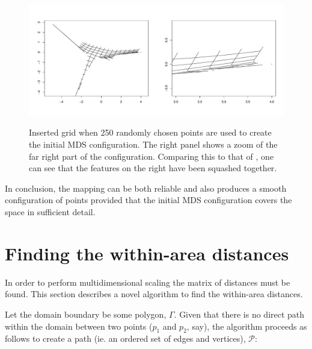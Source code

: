 \begin{figure}
\centering
\includegraphics[width=5in]{mds/figs/wt2-grid-samp.pdf} \\
\caption{Inserted grid when 250 randomly chosen points are used to create the initial MDS configuration. The right panel shows a zoom of the far right part of the configuration. Comparing this to that of , one can see that the features on the right have been squashed together.}
\label{wt2-grid-samp}
\end{figure}

In conclusion, the mapping can be both reliable and also produces a smooth configuration of points provided that the initial MDS configuration covers the space in sufficient detail.


\section{Finding the within-area distances}
\label{mdsdist}
In order to perform multidimensional scaling the matrix of distances must be found. This section describes a novel algorithm to find the within-area distances.

Let the domain boundary be some polygon, $\Gamma$. Given that there is no direct path within the domain between two points ($p_1$ and $p_2$, say), the algorithm proceeds as follows to create a path (ie. an ordered set of edges and vertices), $\mathcal{P}$:

